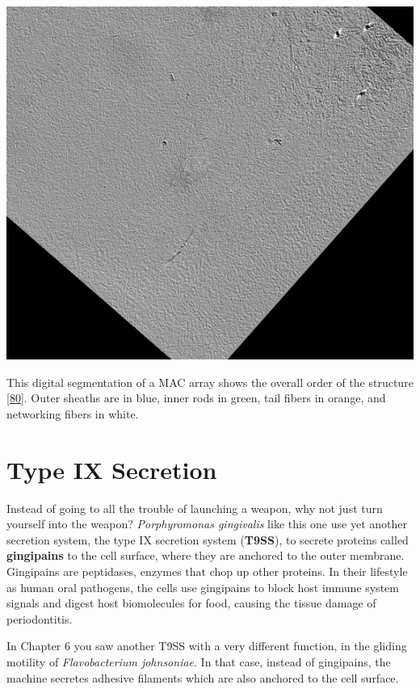 \documentclass[]{tufte-book}
\begin{document}
\includegraphics{img/schematics/9_7_2}

This digital segmentation of a MAC array shows the overall order of the structure {[}\protect\hyperlink{ref-shikuma2014}{80}{]}. Outer sheaths are in blue, inner rods in green, tail fibers in orange, and networking fibers in white.

\hypertarget{type-ix-secretion}{%
\section{Type IX Secretion}\label{type-ix-secretion}}

Instead of going to all the trouble of launching a weapon, why not just turn yourself into the weapon? \emph{Porphyromonas gingivalis} like this one use yet another secretion system, the type IX secretion system (\textbf{T9SS}), to secrete proteins called \textbf{gingipains} to the cell surface, where they are anchored to the outer membrane. Gingipains are peptidases, enzymes that chop up other proteins. In their lifestyle as human oral pathogens, the cells use gingipains to block host immune system signals and digest host biomolecules for food, causing the tissue damage of periodontitis.

In Chapter 6 you saw another T9SS with a very different function, in the gliding motility of \emph{Flavobacterium johnsoniae}. In that case, instead of gingipains, the machine secretes adhesive filaments which are also anchored to the cell surface.
\end{document}
